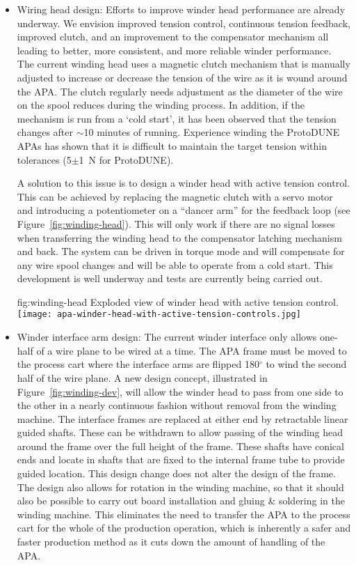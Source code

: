 \begin{itemize}

\item Wiring head design: Efforts to improve winder head performance are already underway. We envision improved tension control, continuous tension feedback, improved clutch, and an improvement to the compensator mechanism all leading to better, more consistent, and more reliable winder performance.  The current winding head uses a magnetic clutch mechanism that is manually adjusted to increase or decrease the tension of the wire as it is wound around the APA. The clutch regularly needs adjustment as the diameter of the wire on the spool reduces during the winding process. In addition, if the mechanism is run from a `cold start', it has been observed that the tension changes after $\sim$10 minutes of running. Experience winding the ProtoDUNE APAs has shown that it is difficult to maintain the target tension within tolerances (5$\pm$\SI{1}{N} for ProtoDUNE).

A solution to this issue is to design a winder head with active tension control. This can be achieved by replacing the magnetic clutch with a servo motor and introducing a potentiometer on a ``dancer arm'' for the feedback loop (see Figure~\ref{fig:winding-head}). This will only work if there are no signal losses when transferring the winding head to the compensator latching mechanism and back. The system can be driven in torque mode and will compensate for any wire spool changes and will be able to operate from a cold start. This development is well underway and tests are currently being carried out.

\begin{dunefigure}{fig:winding-head}
{Exploded view of winder head with active tension control.}
\texttt{[image: apa-winder-head-with-active-tension-controls.jpg]}
\end{dunefigure}

\item Winder interface arm design: The current winder interface only allows one-half of a wire plane to be wired at a time. The APA frame must be moved to the process cart where the interface arms are flipped 180$^\circ$ to wind the second half of the wire plane.  A new design concept, illustrated in Figure~\ref{fig:winding-dev}, will allow the winder head to pass from one side to the other in a nearly continuous fashion without removal from the winding machine.  The interface frames are replaced at either end by retractable linear guided shafts. These can be withdrawn to allow passing of the winding head around the frame over the full height of the frame. These shafts have conical ends and locate in shafts that are fixed to the internal frame tube to provide guided location. This design change does not alter the design of the frame. The design also allows for rotation in the winding machine, so that it should also be possible to carry out board installation and gluing \& soldering in the winding machine. This eliminates the need to transfer the APA to the process cart for the whole of the production operation, which is inherently a safer and faster production method as it cuts down the amount of handling of the APA.


\end{itemize}
